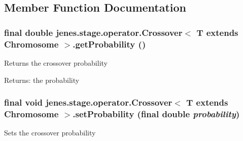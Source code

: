 \subsection{Member Function Documentation}
\hypertarget{classjenes_1_1stage_1_1operator_1_1_crossover_3_01_t_01extends_01_chromosome_01_4_86b60220061c4bf1f0eaae66d22f5eb8}{
\subsubsection[getProbability]{\setlength{\rightskip}{0pt plus 5cm}final double jenes.stage.operator.Crossover$<$ T extends Chromosome $>$.getProbability ()}}
\label{classjenes_1_1stage_1_1operator_1_1_crossover_3_01_t_01extends_01_chromosome_01_4_86b60220061c4bf1f0eaae66d22f5eb8}


Returns the crossover probability

\begin{Desc}
\item[Returns:]the probability \end{Desc}
\hypertarget{classjenes_1_1stage_1_1operator_1_1_crossover_3_01_t_01extends_01_chromosome_01_4_c491f1c3b3b8c074f3b59bc33f65f389}{
\subsubsection[setProbability]{\setlength{\rightskip}{0pt plus 5cm}final void jenes.stage.operator.Crossover$<$ T extends Chromosome $>$.setProbability (final double {\em probability})}}
\label{classjenes_1_1stage_1_1operator_1_1_crossover_3_01_t_01extends_01_chromosome_01_4_c491f1c3b3b8c074f3b59bc33f65f389}


Sets the crossover probability

